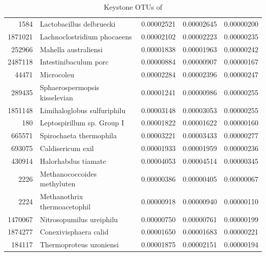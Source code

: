 \begin{table}[ht]
\begin{tabular}{rlrrr}
  1584 & Lactobacillus delbruecki & 0.00002521 & 0.00002645 & 0.00000200 \\ 
  1871021 & Lachnoclostridium phocaeens & 0.00002102 & 0.00002223 & 0.00000235 \\ 
  252966 & Mahella australiensi & 0.00001838 & 0.00001963 & 0.00000242 \\ 
  2487118 & Intestinibaculum porc & 0.00000884 & 0.00000907 & 0.00000167 \\ 
  44471 & Microcoleu & 0.00002284 & 0.00002396 & 0.00000247 \\ 
  289435 & Sphaerospermopsis kisselevian & 0.00001241 & 0.00000986 & 0.00000255 \\ 
  1851148 & Limihaloglobus sulfuriphilu & 0.00003148 & 0.00003053 & 0.00000255 \\ 
  180 & Leptospirillum sp. Group I & 0.00001822 & 0.00001622 & 0.00000160 \\ 
  665571 & Spirochaeta thermophila & 0.00003221 & 0.00003433 & 0.00000277 \\ 
  693075 & Caldisericum exil & 0.00001933 & 0.00001959 & 0.00000236 \\ 
  430914 & Halorhabdus tiamate & 0.00004053 & 0.00004514 & 0.00000345 \\ 
  2226 & Methanococcoides methyluten & 0.00000386 & 0.00000405 & 0.00000067 \\ 
  2224 & Methanothrix thermoacetophil & 0.00000918 & 0.00000940 & 0.00000110 \\ 
  1470067 & Nitrosopumilus ureiphilu & 0.00000750 & 0.00000761 & 0.00000199 \\ 
  1874277 & Conexivisphaera calid & 0.00001650 & 0.00001683 & 0.00000221 \\ 
  184117 & Thermoproteus uzoniensi & 0.00001875 & 0.00002151 & 0.00000194 \\ 
   \hline
\end{tabular}
\caption{Keystone OTUs of } 
\end{table}
